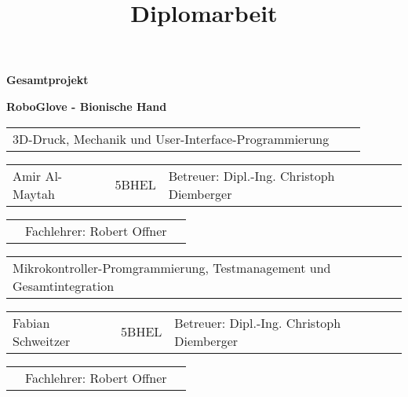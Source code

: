 \documentclass[11pt]{article}
\begin{document}

\begin{titlepage}
	
	\title{\textbf{\Huge{Diplomarbeit}}}
	\maketitle
	\thispagestyle{empty}

	\begin{center}

		\hfill \break
		\hfill \break
		\hfill \break
		\textbf{\Large{Gesamtprojekt}} \break
		\par
		\textbf{\LARGE{RoboGlove - Bionische Hand}}

		\hfill \break
		\hfill \break
		\hfill \break
		\hfill \break
		\hfill \break

		\begin{tabular}{p{10cm}p{1cm}l}
			3D-Druck, Mechanik und User-Interface-Programmierung \\
		\end{tabular}

		\begin{tabular}{p{3cm}p{2cm}l}
			Amir Al-Maytah & 5BHEL & Betreuer: Dipl.-Ing. Christoph Diemberger \\
		\end{tabular}

		\begin{tabular}{p{3.26cm}p{5cm}l}
			& Fachlehrer: Robert Offner 
		\end{tabular}

		\hfill \break

		\begin{tabular}{p{14cm}p{1cm}l}
			Mikrokontroller-Promgrammierung, Testmanagement und Gesamtintegration \\
		\end{tabular}

		\begin{tabular}{p{3cm}p{2cm}l}
			Fabian Schweitzer & 5BHEL & Betreuer: Dipl.-Ing. Christoph Diemberger \\
		\end{tabular}

		\begin{tabular}{p{3.26cm}p{5cm}l}
			& Fachlehrer: Robert Offner 
		\end{tabular}


\end{center}
\end{titlepage}
\end{document}
